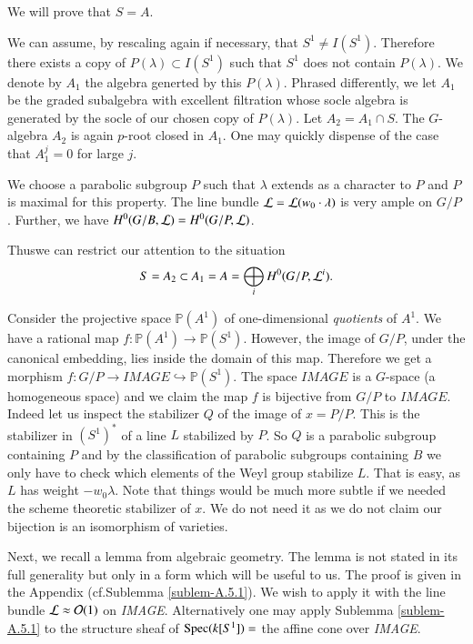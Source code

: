 We will prove that $S=A$.

We can assume, by rescaling again if necessary, that $S^{1}\neq
I(S^{1})$. Therefore there exists a copy of $P(\lambda)\subset
I(S^{1})$ such that $S^{1}$ does not contain $P(\lambda)$. We denote
by $A_{1}$ the algebra generted by this $P(\lambda)$. Phrased
differently, we let $A_{1}$ be the graded subalgebra with excellent
filtration whose socle algebra is generated by the socle of our chosen
copy of $P(\lambda)$. Let $A_{2}=A_{1}\cap S$. The $G$-algebra $A_{2}$
is again $p$-root closed in $A_{1}$. One may quickly dispense of the
case that $A^{j}_{1}=0$ for large $j$.

We choose a parabolic subgroup $P$ such that $\lambda$ extends as a
character to $P$ and $P$ is maximal for this property. The line bundle
$\mathcal{L}=\mathcal{L}(w_{0}\cdot\lambda)$ is very ample on $G/P$ \cite[II
  8.5]{key11}. Further, we have $H^{0}(G/B,\mathcal{L})=H^{0}(G/P,\mathcal{L})$. 

Thus\pageoriginale we\label{page38} can restrict our attention to the situation
$$
S=A_{2}\subset A_{1}=A=\bigoplus_{i}H^{0}(G/P,\mathcal{L}^{i}).
$$

Consider the projective space $\mathbb{P}(A^{1})$ of one-dimensional
{\em quotients} of $A^{1}$. We have a rational map
$f:\mathbb{P}(A^{1})\to \mathbb{P}(S^{1})$. However, the image of
$G/P$, under the canonical embedding, lies inside the domain of this
map. Therefore we get a morphism $f:G/P\to IMAGE\hookrightarrow
\mathbb{P}(S^{1})$. The space $IMAGE$ is a $G$-space (a homogeneous
space) and we claim the map $f$ is bijective from $G/P$ to
$IMAGE$. Indeed let us inspect the stabilizer $Q$ of the image of
$x=P/P$. This is the stabilizer in $(S^{1})^{*}$ of a line $L$
stabilized by $P$. So $Q$ is a parabolic subgroup containing $P$ and
by the classification of parabolic subgroups containing $B$ we only
have to check which elements of the Weyl group stabilize $L$. That is
easy, as $L$ has weight $-w_{0}\lambda$. Note that things would be
much more subtle if we needed the scheme theoretic stabilizer \cite[I
  2.6]{key11} of $x$. We do not need it as we do not claim our
bijection is an isomorphism of varieties.

Next, we recall a lemma from algebraic geometry. The lemma is not
stated in its full generality but only in a form which will be useful
to us. The proof is given in the Appendix (cf.\@ Sublemma \ref{sublem-A.5.1}). We
wish to apply it with the line bundle $\mathcal{L}\approx \mathcal{O}(1)$ on {\em
  IMAGE}. Alternatively one may apply Sublemma \ref{sublem-A.5.1} to the structure
sheaf of $\operatorname{Spec}(k[S^{1}])=$ the affine cone over {\em IMAGE}.

